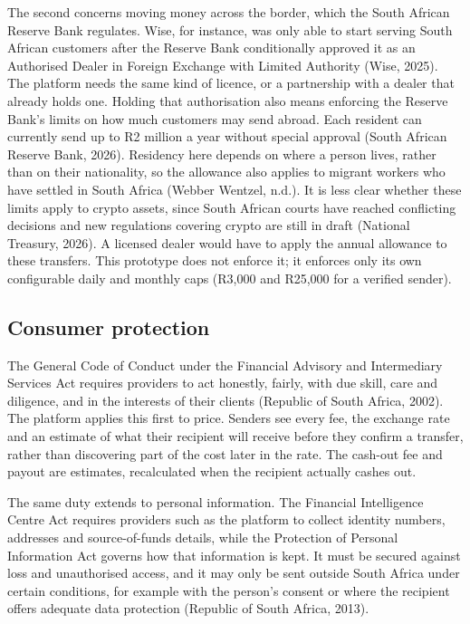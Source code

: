 \documentclass[11pt,a4paper]{article}
\begin{document}
The second concerns moving money across the border, which the South African Reserve Bank regulates. Wise, for instance, was only able to start serving South African customers after the Reserve Bank conditionally approved it as an Authorised Dealer in Foreign Exchange with Limited Authority (Wise, 2025). The platform needs the same kind of licence, or a partnership with a dealer that already holds one. Holding that authorisation also means enforcing the Reserve Bank's limits on how much customers may send abroad. Each resident can currently send up to R2 million a year without special approval (South African Reserve Bank, 2026). Residency here depends on where a person lives, rather than on their nationality, so the allowance also applies to migrant workers who have settled in South Africa (Webber Wentzel, n.d.). It is less clear whether these limits apply to crypto assets, since South African courts have reached conflicting decisions and new regulations covering crypto are still in draft (National Treasury, 2026). A licensed dealer would have to apply the annual allowance to these transfers. This prototype does not enforce it; it enforces only its own configurable daily and monthly caps (R3,000 and R25,000 for a verified sender).

\subsection{Consumer protection}
The General Code of Conduct under the Financial Advisory and Intermediary Services Act requires providers to act honestly, fairly, with due skill, care and diligence, and in the interests of their clients (Republic of South Africa, 2002). The platform applies this first to price. Senders see every fee, the exchange rate and an estimate of what their recipient will receive before they confirm a transfer, rather than discovering part of the cost later in the rate. The cash-out fee and payout are estimates, recalculated when the recipient actually cashes out.

The same duty extends to personal information. The Financial Intelligence Centre Act requires providers such as the platform to collect identity numbers, addresses and source-of-funds details, while the Protection of Personal Information Act governs how that information is kept. It must be secured against loss and unauthorised access, and it may only be sent outside South Africa under certain conditions, for example with the person's consent or where the recipient offers adequate data protection (Republic of South Africa, 2013).
\end{document}
